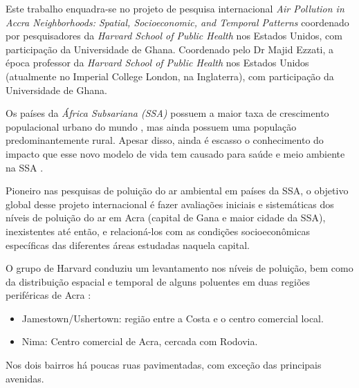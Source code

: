 Este trabalho enquadra-se no projeto de pesquisa internacional 
\textit{Air Pollution in Accra Neighborhoods: Spatial, Socioeconomic, and Temporal Patterns} 
coordenado por pesquisadores da \textit{Harvard School of Public Health} nos Estados Unidos, 
com participação da Universidade de Ghana. 
Coordenado pelo Dr Majid Ezzati, a época professor da \textit{Harvard School of Public Health} 
nos Estados Unidos (atualmente no Imperial College London, na Inglaterra), com participação 
da Universidade de Ghana. 

Os países da \textit{África Subsariana (SSA)} possuem a maior taxa de crescimento 
populacional urbano do mundo \cite{united2006world}, mas ainda possuem uma população 
predominantemente rural. 
Apesar disso, ainda é escasso o conhecimento do impacto que esse novo modelo de vida 
tem causado para saúde e meio ambiente na SSA \cite{cohen2004urban}. 

Pioneiro nas pesquisas de poluição do ar ambiental em países da SSA, o objetivo 
global desse projeto internacional é fazer avaliações iniciais e sistemáticas 
dos níveis de poluição do ar em Acra (capital de Gana e maior cidade da SSA), 
inexistentes até então, e relacioná-los com as condições socioeconômicas 
específicas das diferentes áreas estudadas naquela capital.

O grupo de Harvard \citep{ARKU2008} conduziu um levantamento nos níveis de 
poluição, bem como da distribuição espacial e temporal de alguns poluentes 
em duas regiões periféricas de Acra \citep{DIONISIO2010}:

\begin{itemize}
  \item Jamestown/Ushertown: região entre a Costa e o centro comercial local.
  \item Nima: Centro comercial de Acra, cercada com Rodovia.
\end{itemize} 

Nos dois bairros há poucas ruas pavimentadas, com exceção das principais 
avenidas.
